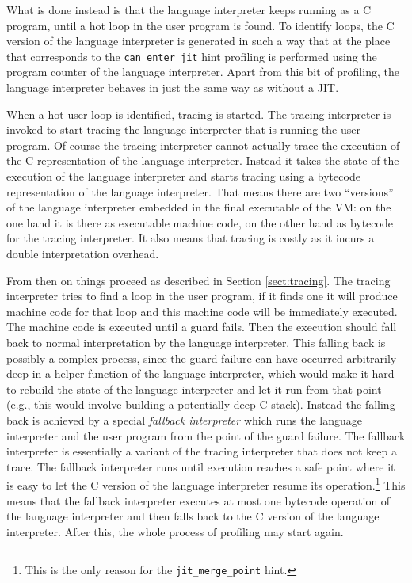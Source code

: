 \documentclass{sig-alternate}
\newcommand\eg{e.g.,\xspace}
\begin{document}
What is done instead is that the language interpreter keeps running as a C
program, until a hot loop in the user program is found. To identify loops, the
C version of the language interpreter is generated in such a way that at the
place that corresponds to the \texttt{can\_enter\_jit} hint profiling is
performed using the program counter of the language interpreter. Apart from this
bit of profiling, the language interpreter behaves in just the same way as
without a JIT.

When a hot user loop is identified, tracing is started. The
tracing interpreter is invoked to start tracing the language interpreter that is
running the user program. Of course the tracing interpreter cannot actually
trace the execution of the C representation of the language interpreter. Instead
it takes the state of the execution of the language interpreter and starts
tracing using a bytecode representation of the language interpreter. That means
there are two ``versions'' of the language interpreter embedded in the final
executable of the VM: on the one hand it is there as executable machine code, on
the other hand as bytecode for the tracing interpreter. It also means that
tracing is costly as it incurs a double interpretation overhead.

From then on things proceed as described in Section \ref{sect:tracing}. The
tracing interpreter tries to find a loop in the user program, if it finds one it
will produce machine code for that loop and this machine code will be
immediately executed. The machine code is executed until a guard fails. Then the
execution should fall back to normal interpretation by the language interpreter.
This falling back is possibly a complex process, since the guard failure can
have occurred arbitrarily deep in a helper function of the language interpreter,
which would make it hard to rebuild the state of the language interpreter and
let it run from that point (\eg this would involve building a potentially deep
C stack). Instead the falling back is achieved by a special \emph{fallback
interpreter} which runs the language interpreter and the user program from the
point of the guard failure. The fallback interpreter is essentially a variant of
the tracing interpreter that does not keep a trace. The fallback interpreter
runs until execution reaches a safe point where it is easy to let the C version
of the language interpreter resume its operation.\footnote{This is the only
reason for the \texttt{jit\_merge\_point} hint.}  This means that the
fallback interpreter executes at most one bytecode operation of the language
interpreter and then falls back to the C version of the language interpreter.
After this, the whole process of profiling may start again.
\end{document}
